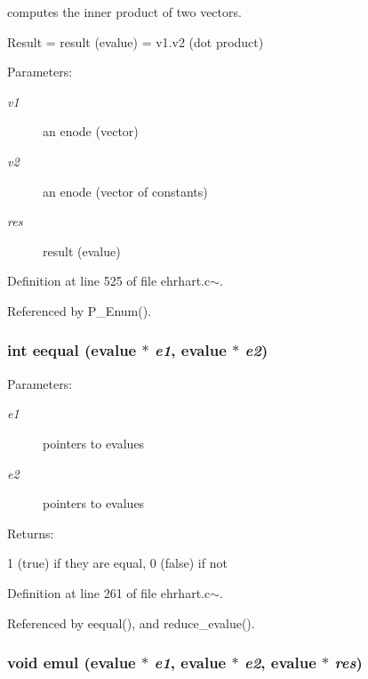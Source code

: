 computes the inner product of two vectors.

Result = result (evalue) = v1.v2 (dot product)\begin{Desc}
\item[Parameters: ]\par
\begin{description}
\item[{\em 
v1}]an enode (vector) \item[{\em 
v2}]an enode (vector of constants) \item[{\em 
res}]result (evalue) \end{description}
\end{Desc}


Definition at line 525 of file ehrhart.c$\sim$.

Referenced by P\_\-Enum().

\subsubsection{\setlength{\rightskip}{0pt plus 5cm}int eequal (evalue $\ast$ {\em e1}, evalue $\ast$ {\em e2})\hspace{0.3cm}{\tt  [static]}}\label{ehrhart_8c~_a12}


\begin{Desc}
\item[Parameters: ]\par
\begin{description}
\item[{\em 
e1}]pointers to evalues \item[{\em 
e2}]pointers to evalues \end{description}
\end{Desc}
\begin{Desc}
\item[Returns: ]\par
1 (true) if they are equal, 0 (false) if not \end{Desc}


Definition at line 261 of file ehrhart.c$\sim$.

Referenced by eequal(), and reduce\_\-evalue().

\subsubsection{\setlength{\rightskip}{0pt plus 5cm}void emul (evalue $\ast$ {\em e1}, evalue $\ast$ {\em e2}, evalue $\ast$ {\em res})\hspace{0.3cm}{\tt  [static]}}\label{ehrhart_8c~_a14}


